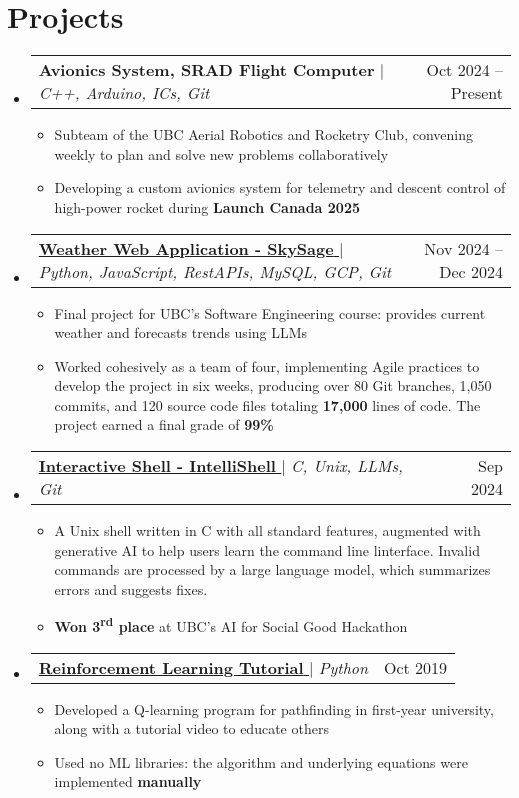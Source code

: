 \documentclass[letterpaper,10pt]{article}
\makeatletter
\newcommand{\resumeItem}[1]{
  \item\small{
    {#1 \vspace{-2pt}}
  }
}
\newcommand{\resumeProjectHeading}[2]{
    \item
    \begin{tabular*}{0.97\textwidth}{l@{\extracolsep{\fill}}r}
      \small#1 & #2 \\
    \end{tabular*}\vspace{-7pt}
}
\newcommand{\resumeSubHeadingListStart}{\begin{itemize}[leftmargin=0.15in, label={}]}
\newcommand{\resumeSubHeadingListEnd}{\end{itemize}}
\newcommand{\resumeItemListStart}{\begin{itemize}}
\newcommand{\resumeItemListEnd}{\end{itemize}\vspace{-5pt}}
\def\iconSpace{0.5pt}
\def\projectSpaceBefore{1pt}
\makeatother
\begin{document}
\section{Projects}
    \resumeSubHeadingListStart
      \resumeProjectHeading
          {\textbf{Avionics System, SRAD Flight Computer} $|$ \textit{C++, Arduino, ICs, Git}}{Oct 2024 -- Present}
          \resumeItemListStart
            \vspace{\projectSpaceBefore}
            \resumeItem{Subteam of the UBC Aerial Robotics and Rocketry Club, convening weekly to plan and solve new problems collaboratively}
            \resumeItem{Developing a custom avionics system for telemetry and descent control of high-power rocket during \textbf{Launch Canada 2025}}
          \resumeItemListEnd
      \resumeProjectHeading
          {\href{https://github.com/rileyeaton-ubc/SkySage}{\textbf{Weather Web Application - SkySage} \faGithub} \hspace{\iconSpace}$|$ \textit{Python, JavaScript, RestAPIs, MySQL, GCP, Git}}{Nov 2024 -- Dec 2024}
          \resumeItemListStart
            \vspace{\projectSpaceBefore}
            \resumeItem{Final project for UBC's Software Engineering course: provides current weather and forecasts trends using LLMs}
            \resumeItem{Worked cohesively as a team of four, implementing Agile practices to develop the project in six weeks, producing over 80 Git branches, 1,050 commits, and 120 source code files totaling \textbf{17,000} lines of code. The project earned a final grade of \textbf{99\%}}
          \resumeItemListEnd
      \resumeProjectHeading
          {\href{https://github.com/rileyeaton-ubc/intellishell-ai-hackathon}{\textbf{Interactive Shell - IntelliShell} \faGithub} \hspace{\iconSpace}$|$ \textit{C, Unix, LLMs, Git}}{Sep 2024}
          \resumeItemListStart
            \vspace{\projectSpaceBefore}
            \resumeItem{A Unix shell written in C with all standard features, augmented with generative AI to help users learn the command line linterface. Invalid commands are processed by a large language model, which summarizes errors and suggests fixes.}
            \resumeItem{\textbf{Won 3\textsuperscript{rd} place} at UBC's AI for Social Good Hackathon}
          \resumeItemListEnd
      \resumeProjectHeading
          {\href{https://youtu.be/e59wArs9kp4}{\textbf{Reinforcement Learning Tutorial} \faYoutubePlay} \hspace{\iconSpace}$|$ \textit{Python}}{Oct 2019}
          \resumeItemListStart
            \vspace{\projectSpaceBefore}
            \resumeItem{Developed a Q-learning program for pathfinding in first-year university, along with a tutorial video to educate others}
            \resumeItem{Used no ML libraries: the algorithm and underlying equations were implemented \textbf{manually}}
          \resumeItemListEnd
    \resumeSubHeadingListEnd
\end{document}
